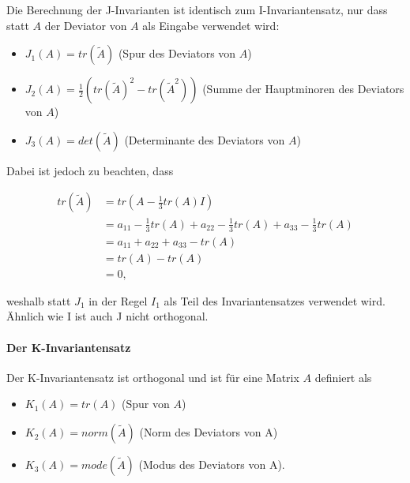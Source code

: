 \documentclass[a4paper,fontsize=12pt,toc=bib,parskip=half,ngerman]{scrartcl}
\begin{document}
Die Berechnung der J-Invarianten ist identisch zum I-Invarian\-ten\-satz, nur dass statt $A$ der Deviator von $A$ als Eingabe verwendet wird:

\begin{itemize}
	\item $J_1(A) = tr(\tilde{A})$ (Spur des Deviators von $A$)
	\item $J_2(A) = \frac{1}{2}(tr(\tilde{A})^2 - tr(\tilde{A}^2))$ (Summe der Hauptminoren des Deviators von $A$)
\item $J_3(A) = det(\tilde{A})$ (Determinante des Deviators von $A$)
\end{itemize}

Dabei ist jedoch zu beachten, dass

\begin{equation}
	\begin{split}
	tr(\tilde{A}) &= tr(A - \frac{1}{3}tr(A)I)\\
	&= a_{11} - \frac{1}{3} tr(A) + a_{22} - \frac{1}{3} tr(A) + a_{33} - \frac{1}{3} tr(A)\\
	&= a_{11} + a_{22} + a_{33} - tr(A)\\
	&= tr(A) - tr(A)\\
	&= 0,
	\end{split}
\end{equation}

weshalb statt $J_1$ in der Regel $I_1$ als Teil des Invariantensatzes verwendet wird. \"Ahnlich wie I ist auch J nicht orthogonal.

\paragraph{Der K-Invariantensatz}
Der K-Invariantensatz ist orthogonal und ist f\"ur eine Matrix $A$ definiert als

\begin{itemize}
	\item $K_1(A)=tr(A)$ (Spur von $A$)
	\item $K_2(A)=norm(\tilde{A})$ (Norm des Deviators von A)
	\item $K_3(A)=mode(\tilde{A})$ (Modus des Deviators von A).
\end{itemize}
\end{document}
